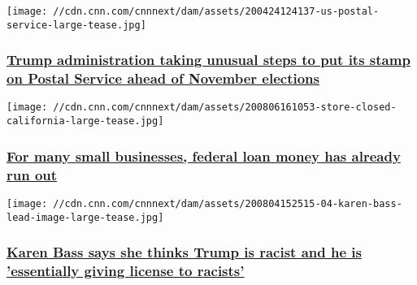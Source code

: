 \href{/2020/08/06/politics/trump-administration-postal-service-elections/index.html}{}

\texttt{[image: //cdn.cnn.com/cnnnext/dam/assets/200424124137-us-postal-service-large-tease.jpg]}

\hypertarget{trump-administration-taking-unusual-steps-to-put-its-stamp-on-postal-service-ahead-of-november-elections}{%
\subsubsection{\texorpdfstring{\href{/2020/08/06/politics/trump-administration-postal-service-elections/index.html}{Trump
administration taking unusual steps to put its stamp on Postal Service
ahead of November
elections}}{Trump administration taking unusual steps to put its stamp on Postal Service ahead of November elections}}\label{trump-administration-taking-unusual-steps-to-put-its-stamp-on-postal-service-ahead-of-november-elections}}

\href{/2020/08/06/politics/ppp-small-business-loan-congress-second-round/index.html}{}

\texttt{[image: //cdn.cnn.com/cnnnext/dam/assets/200806161053-store-closed-california-large-tease.jpg]}

\hypertarget{for-many-small-businesses-federal-loan-money-has-already-run-out}{%
\subsubsection{\texorpdfstring{\href{/2020/08/06/politics/ppp-small-business-loan-congress-second-round/index.html}{For
many small businesses, federal loan money has already run
out}}{For many small businesses, federal loan money has already run out}}\label{for-many-small-businesses-federal-loan-money-has-already-run-out}}

\href{/2020/08/06/politics/karen-bass-says-trump-racist/index.html}{}

\texttt{[image: //cdn.cnn.com/cnnnext/dam/assets/200804152515-04-karen-bass-lead-image-large-tease.jpg]}

\hypertarget{karen-bass-says-she-thinks-trump-is-racist-and-he-is-essentially-giving-license-to-racists}{%
\subsubsection{\texorpdfstring{\href{/2020/08/06/politics/karen-bass-says-trump-racist/index.html}{Karen
Bass says she thinks Trump is racist and he is 'essentially giving
license to
racists'}}{Karen Bass says she thinks Trump is racist and he is 'essentially giving license to racists'}}\label{karen-bass-says-she-thinks-trump-is-racist-and-he-is-essentially-giving-license-to-racists}}

